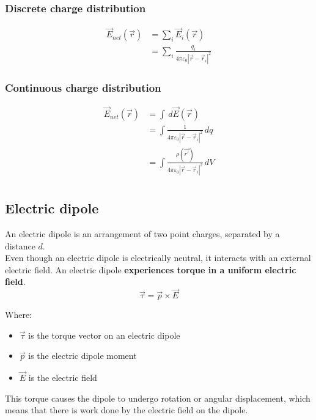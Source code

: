 \documentclass[11pt]{article}
\begin{document}
\subsubsection{Discrete charge distribution}
\label{sec:org751acb0}
\begin{align*}
\vec{E}_{net} (\vec{r}) &= \sum_{i} \vec{E}_{i} (\vec{r}) \\
&= \sum_{i} \frac{q_i}{4 \pi \varepsilon_0 |\vec{r} - \vec{r}_i|^2}
\end{align*}

\subsubsection{Continuous charge distribution}
\label{sec:org0a2ddf2}
\begin{align*}
\vec{E}_{net} (\vec{r}) &= \int \, d \vec{E} (\vec{r}) \\
&= \int \frac{1}{4 \pi \varepsilon_0 |\vec{r} - \vec{r}_i|^2} \, dq \\
&= \int \frac{\rho (\vec{r'})}{4 \pi \varepsilon_0 |\vec{r} - \vec{r}_i|^2} \, dV \\
\end{align*}

\newpage

\subsection{Electric dipole}
\label{sec:orgd83c7d5}
An electric dipole is an arrangement of two point charges, separated by a distance \(d\).
\\[0pt]

Even though an electric dipole is electrically neutral, it interacts with an external electric field. An electric dipole \textbf{experiences torque in a uniform electric field}.
\[\vec{\tau} = \vec{p} \times \vec{E} \]

Where:
\begin{itemize}
\item \(\vec{\tau}\) is the torque vector on an electric dipole
\item \(\vec{p}\) is the electric dipole moment
\item \(\vec{E}\) is the electric field
\end{itemize}

This torque causes the dipole to undergo rotation or angular displacement, which means that there is work done by the electric field on the dipole.
\\[0pt]
\end{document}
